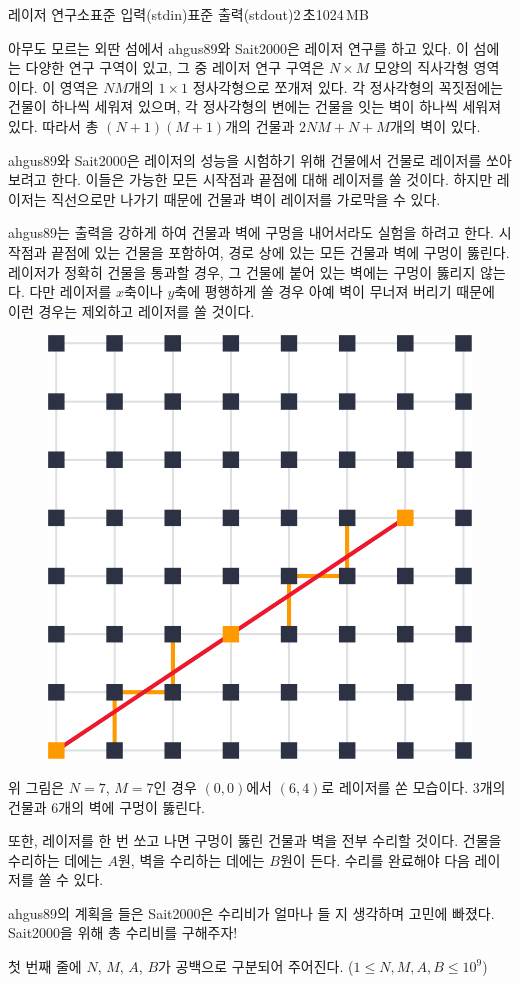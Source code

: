 \begin{problem}{레이저 연구소}{표준 입력(stdin)}{표준 출력(stdout)}{2\,초}{1024\,MB}
    
아무도 모르는 외딴 섬에서 ahgus89와 Sait2000은 레이저 연구를 하고 있다. 이 섬에는 다양한 연구 구역이 있고, 그 중 레이저 연구 구역은 $N \times M$ 모양의 직사각형 영역이다. 이 영역은 $NM$개의 $1 \times  1$ 정사각형으로 쪼개져 있다. 각 정사각형의 꼭짓점에는 건물이 하나씩 세워져 있으며, 각 정사각형의 변에는 건물을 잇는 벽이 하나씩 세워져 있다. 따라서 총 $\left(N+1\right)\left(M+1\right)$개의 건물과 $2NM+N+M$개의 벽이 있다.

ahgus89와 Sait2000은 레이저의 성능을 시험하기 위해 건물에서 건물로 레이저를 쏘아 보려고 한다. 이들은 가능한 모든 시작점과 끝점에 대해 레이저를 쏠 것이다. 하지만 레이저는 직선으로만 나가기 때문에 건물과 벽이 레이저를 가로막을 수 있다. 

ahgus89는 출력을 강하게 하여 건물과 벽에 구멍을 내어서라도 실험을 하려고 한다. 시작점과 끝점에 있는 건물을 포함하여, 경로 상에 있는 모든 건물과 벽에 구멍이 뚫린다. 레이저가 정확히 건물을 통과할 경우, 그 건물에 붙어 있는 벽에는 구멍이 뚫리지 않는다. 다만 레이저를 $x$축이나 $y$축에 평행하게 쏠 경우 아예 벽이 무너져 버리기 때문에 이런 경우는 제외하고 레이저를 쏠 것이다. 

\begin{figure}[h!]
\centering
  \includegraphics[width=.35\linewidth]{../picture/laser.png}
\end{figure}

위 그림은 $N=7$, $M=7$인 경우 $\left(0, 0\right)$에서 $\left(6, 4\right)$로 레이저를 쏜 모습이다. $3$개의 건물과 $6$개의 벽에 구멍이 뚫린다.

또한, 레이저를 한 번 쏘고 나면 구멍이 뚫린 건물과 벽을 전부 수리할 것이다. 건물을 수리하는 데에는 $A$원, 벽을 수리하는 데에는 $B$원이 든다. 수리를 완료해야 다음 레이저를 쏠 수 있다.

ahgus89의 계획을 들은 Sait2000은 수리비가 얼마나 들 지 생각하며 고민에 빠졌다. Sait2000을 위해 총 수리비를 구해주자!


\InputFile
첫 번째 줄에 $N$, $M$, $A$, $B$가 공백으로 구분되어 주어진다. ($1 \leq N, M, A, B \leq 10^{9}$)


\end{problem}
